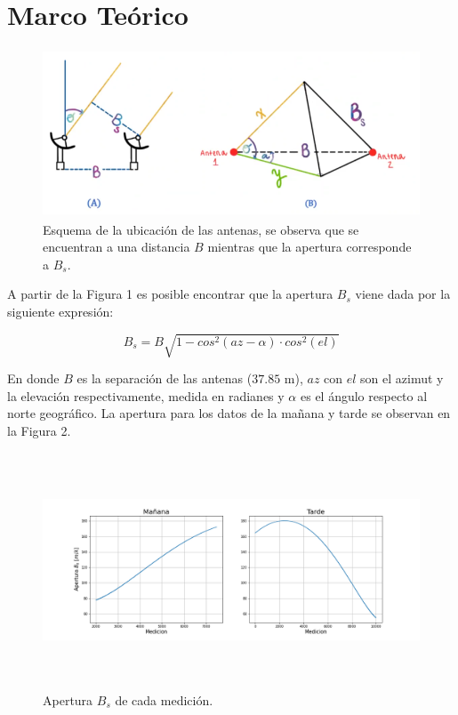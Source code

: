 \documentclass[letterpaper,oneside]{article}
\begin{document}
\section{Marco Teórico}
\begin{figure}
  \centering
  \includegraphics[height=5cm]{../graficos/interferometro.png}
  \caption{Esquema de la ubicación de las antenas, se observa que se encuentran a una distancia $B$ mientras que la apertura corresponde a $B_s$.}
\end{figure}

A partir de la Figura 1 es posible encontrar que la apertura $B_s$ viene dada por la siguiente expresión:

\begin{equation}
    B_s = B\sqrt{1-cos^2(az-\alpha)\cdot cos^2(el)}
\end{equation}

En donde $B$ es la separación de las antenas ($37.85$ m), $az$ con $el$ son el azimut y la elevación respectivamente, medida en radianes y $\alpha$ es el ángulo respecto al norte geográfico. La apertura para los datos de la mañana y tarde se observan en la Figura 2.\\

\begin{figure}
  \centering
  \includegraphics[height=7cm]{../graficos/aperturas.png}
  \caption{Apertura $B_s$ de cada medición.}
\end{figure}
\end{document}
